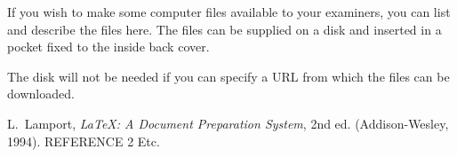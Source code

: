 \documentclass[12pt,openany,a4paper]{book}
\begin{document}
If you wish to make some computer files available to your examiners,
you can list and describe the files here.  The files can be supplied
on a disk and inserted in a pocket fixed to the inside back cover.

The disk will not be needed if you can specify a URL from which the
files can be downloaded.

\cleardoublepage

\begin{thebibliography}{99}
 L.~Lamport, \emph{\LaTeX: A Document Preparation
System}, 2nd ed. (Addison-Wesley, 1994).
 REFERENCE 2
 Etc.
\end{thebibliography}
\end{document}
